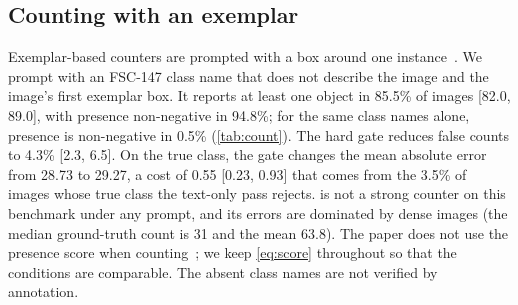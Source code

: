 \subsection{Counting with an exemplar}
\label{sec:counting}

\begin{table}[t]
    \centering
    \small
    
    \caption{\textbf{FSC-147, 400 test images.}
    The count is the number of kept masks; the box is the image's first exemplar box.
    \emph{False count}: at least one mask is kept when the phrase is another FSC-147 class name, drawn with a fixed seed, that does not describe the image.}
    \label{tab:count}
\end{table}

Exemplar-based counters are prompted with a box around one instance~\cite{ranjan2021fsc}.
We prompt \sam{} with an FSC-147 class name that does not describe the image and the image's first exemplar box.
It reports at least one object in 85.5\% of images [82.0, 89.0], with presence non-negative in 94.8\%; for the same class names alone, presence is non-negative in 0.5\% (\cref{tab:count}).
The hard gate reduces false counts to 4.3\% [2.3, 6.5].
On the true class, the gate changes the mean absolute error from 28.73 to 29.27, a cost of 0.55 [0.23, 0.93] that comes from the 3.5\% of images whose true class the text-only pass rejects.
\sam{} is not a strong counter on this benchmark under any prompt, and its errors are dominated by dense images (the median ground-truth count is 31 and the mean 63.8).
The \sam{} paper does not use the presence score when counting~\cite{carion2026sam3}; we keep \cref{eq:score} throughout so that the conditions are comparable.
The absent class names are not verified by annotation.
